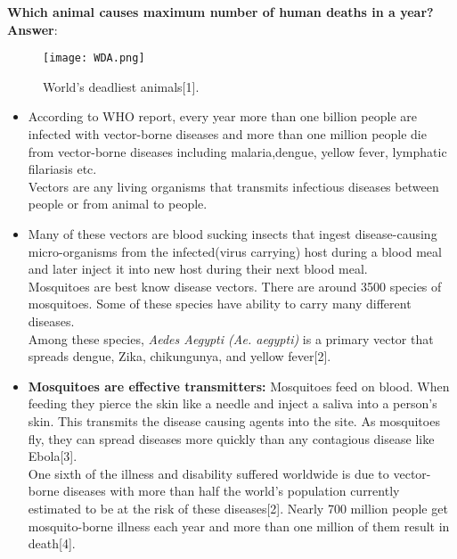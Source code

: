 \documentclass[11pt]{exam}
\begin{document}
\newpage
\begin{questions}
\question
\label{Q1:Most lethal animal}
\textbf{Which animal causes maximum number of human deaths in a year?}  \\
\textbf{Answer}:
\begin{figure}[H]
  \centering
   \texttt{[image: WDA.png]}
  \caption{World's deadliest animals[1].}
   \label{fig: World's deadliest animals }
\end{figure}
\begin{itemize}
\item According to WHO report, every year more than one billion people are infected with vector-borne diseases and more than one million people die from vector-borne diseases including malaria,dengue, yellow fever, lymphatic filariasis etc. \\
Vectors are any living organisms that transmits infectious diseases between people or from animal to people.\\ %
\item Many of these vectors are blood sucking insects that ingest disease-causing micro-organisms from the infected(virus carrying) host during a blood meal and later inject it into new host during their next blood meal.     \\
Mosquitoes are best know disease vectors. There are around 3500 species of mosquitoes. Some of these species have ability to carry many different diseases.\\
Among these species, \textit{Aedes Aegypti (Ae. aegypti)} is a primary vector that spreads dengue, Zika, chikungunya, and yellow fever[2].\\ 
\item \textbf{Mosquitoes are effective transmitters:} Mosquitoes feed on blood. When feeding they pierce the skin like a needle and inject a saliva into a person's skin. This transmits the disease causing agents into the site. As mosquitoes fly, they can spread diseases more quickly than any contagious disease like Ebola[3]. \\ 
One sixth of the illness and disability suffered worldwide is due to vector-borne diseases with more than half the world's population currently estimated to be at the risk of these diseases[2].  
Nearly 700 million people get mosquito-borne illness each year and more than one million of them result in death[4]. \\ 


\end{itemize}
\end{questions}
\end{document}
